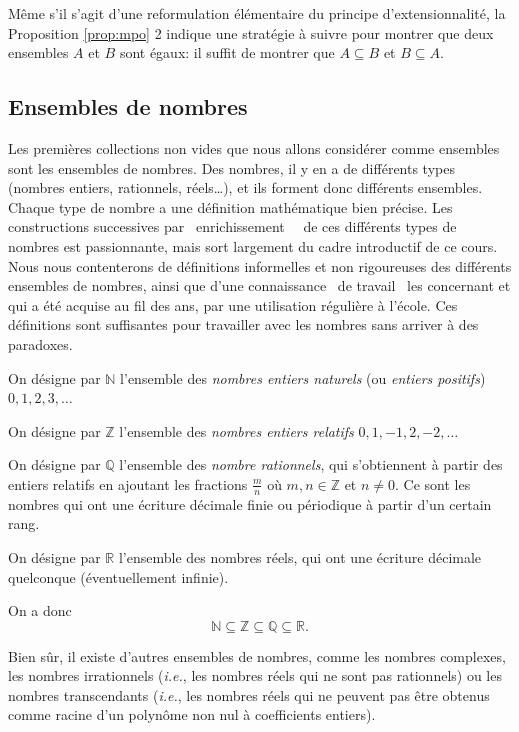 \documentclass[french,course,oneside,theoremnosection]{lecture}
\newcommand{\R}{\mathbb{R}}
\newcommand{\N}{\mathbb{N}}
\newcommand{\Z}{\mathbb{Z}}
\newcommand{\Q}{\mathbb{Q}}
\begin{document}
Même s'il s'agit d'une reformulation élémentaire du principe d'extensionnalité, la Proposition  \ref{prop:mpo} 2 indique une stratégie à suivre pour montrer que deux ensembles $A$ et $B$ sont égaux: il suffit de montrer que $A\subseteq B$ et $B \subseteq A$.

\subsection{Ensembles de nombres}
Les premières collections non vides que nous allons considérer comme ensembles sont les ensembles de nombres. Des nombres, il y en a de différents types (nombres entiers, rationnels, réels\ldots), et ils forment donc différents ensembles. Chaque type de nombre a une définition mathématique bien précise. Les constructions successives par \og~enrichissement~\fg{}~ de ces différents types de nombres est passionnante, mais sort largement du cadre introductif de ce cours. Nous nous contenterons de définitions informelles et non rigoureuses des différents ensembles de nombres, ainsi que d'une connaissance \og~de travail~\fg{} les concernant et qui a été acquise au fil des ans, par une utilisation régulière à l'école. Ces définitions sont suffisantes pour travailler avec les nombres sans arriver à des paradoxes. 

\begin{definition}
On désigne par $\N$ l'ensemble des \emph{nombres entiers naturels} (ou \emph{entiers positifs}) $0, 1, 2, 3, \ldots$

On désigne par $\Z$ l'ensemble des \emph{nombres entiers relatifs} $0, 1, -1, 2, -2, \ldots$ 

On désigne par $\Q$ l'ensemble des \emph{nombre rationnels}, qui s'obtiennent à partir des entiers relatifs en ajoutant les fractions $\frac{m}{n}$ où $m, n \in \Z$ et $n\neq 0$. Ce sont les nombres qui ont une écriture décimale finie ou périodique à partir d'un certain rang.

On désigne par $\R$ l'ensemble des nombres réels, qui ont une écriture décimale quelconque (éventuellement infinie).
\end{definition}
On a donc
\[
\N \subseteq \Z \subseteq \Q \subseteq \R.
\]

Bien sûr, il existe d'autres ensembles de nombres, comme les nombres complexes, les nombres irrationnels (\emph{i.e.}, les nombres réels qui ne sont pas rationnels) ou les nombres transcendants (\emph{i.e.}, les nombres réels qui ne peuvent pas être obtenus comme racine d'un polynôme non nul à coefficients entiers).
\end{document}
